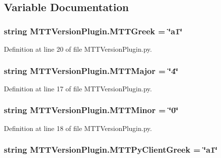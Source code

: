 \subsection{Variable Documentation}
\hypertarget{namespace_m_t_t_version_plugin_ac27a9d2aec2e835e6f4dc27c68382f38}{
\subsubsection[{M\-T\-T\-Greek}]{\setlength{\rightskip}{0pt plus 5cm}string M\-T\-T\-Version\-Plugin.\-M\-T\-T\-Greek = \char`\"{}a1\char`\"{}}}\label{namespace_m_t_t_version_plugin_ac27a9d2aec2e835e6f4dc27c68382f38}


Definition at line 20 of file M\-T\-T\-Version\-Plugin.\-py.

\hypertarget{namespace_m_t_t_version_plugin_af9e75ea5f854bed820d4cb64fa455124}{
\subsubsection[{M\-T\-T\-Major}]{\setlength{\rightskip}{0pt plus 5cm}string M\-T\-T\-Version\-Plugin.\-M\-T\-T\-Major = \char`\"{}4\char`\"{}}}\label{namespace_m_t_t_version_plugin_af9e75ea5f854bed820d4cb64fa455124}


Definition at line 17 of file M\-T\-T\-Version\-Plugin.\-py.

\hypertarget{namespace_m_t_t_version_plugin_ad80f82936d1bc7547278d4ce2ea3a275}{
\subsubsection[{M\-T\-T\-Minor}]{\setlength{\rightskip}{0pt plus 5cm}string M\-T\-T\-Version\-Plugin.\-M\-T\-T\-Minor = \char`\"{}0\char`\"{}}}\label{namespace_m_t_t_version_plugin_ad80f82936d1bc7547278d4ce2ea3a275}


Definition at line 18 of file M\-T\-T\-Version\-Plugin.\-py.

\hypertarget{namespace_m_t_t_version_plugin_a6df21a21318661784dcabdb81450ff48}{
\subsubsection[{M\-T\-T\-Py\-Client\-Greek}]{\setlength{\rightskip}{0pt plus 5cm}string M\-T\-T\-Version\-Plugin.\-M\-T\-T\-Py\-Client\-Greek = \char`\"{}a1\char`\"{}}}\label{namespace_m_t_t_version_plugin_a6df21a21318661784dcabdb81450ff48}


